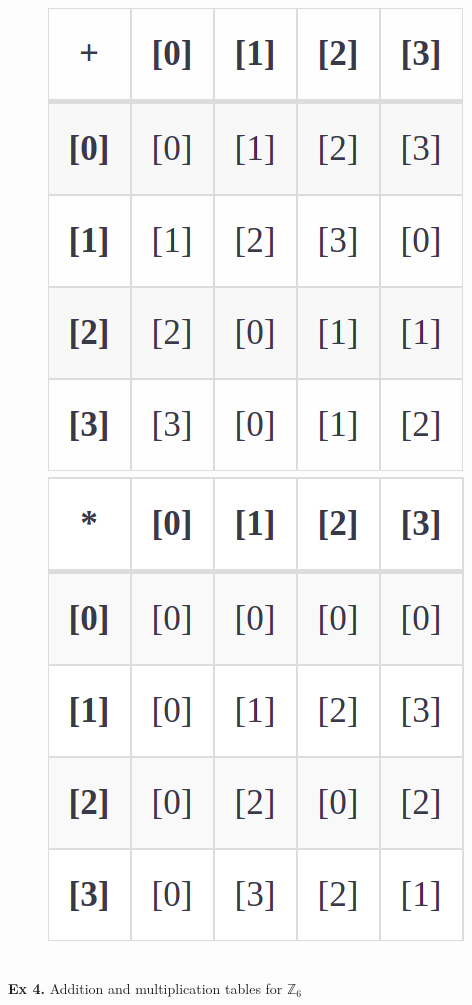 \documentclass{article}
\begin{document}
\begin{figure}[h]
\centering
\includegraphics[scale=0.5]{11_5_3a.png}
\includegraphics[scale=0.5]{11_5_3b.png}
\end{figure}\\
\newpage
\noindent\textbf{Ex 4.} Addition and multiplication tables for $\mathbb{Z}_6$
\end{document}
